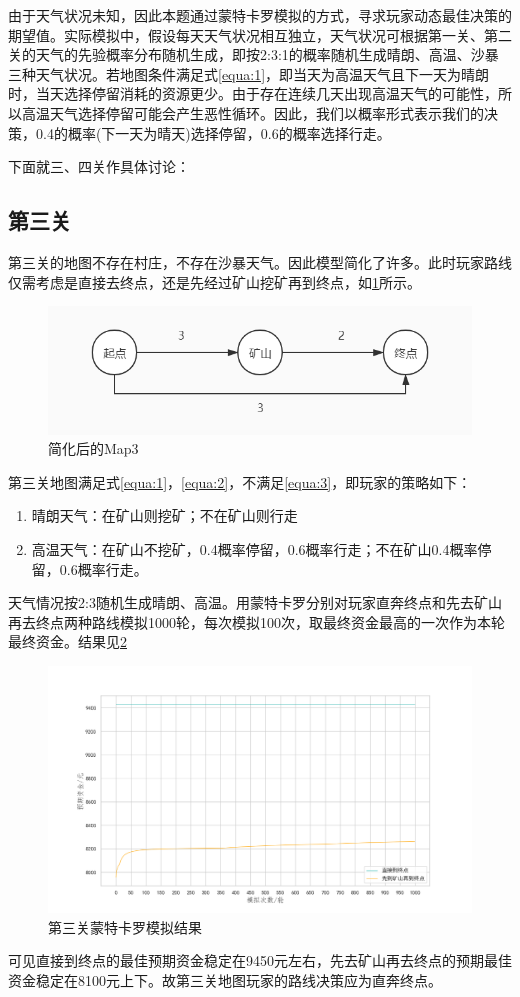 \documentclass[withoutpre]{cumcmthesis} %
\begin{document}
由于天气状况未知，因此本题通过蒙特卡罗模拟的方式，寻求玩家动态最佳决策的期望值。实际模拟中，假设每天天气状况相互独立，天气状况可根据第一关、第二关的天气的先验概率分布随机生成，即按2:3:1的概率随机生成晴朗、高温、沙暴三种天气状况。若地图条件满足式\cref{equa:1}，即当天为高温天气且下一天为晴朗时，当天选择停留消耗的资源更少。由于存在连续几天出现高温天气的可能性，所以高温天气选择停留可能会产生恶性循环。因此，我们以概率形式表示我们的决策，0.4的概率(下一天为晴天)选择停留，0.6的概率选择行走。

下面就三、四关作具体讨论：
\subsection{第三关}
第三关的地图不存在村庄，不存在沙暴天气。因此模型简化了许多。此时玩家路线仅需考虑是直接去终点，还是先经过矿山挖矿再到终点，如\cref{fig:map3}所示。
\begin{figure}[H]
	\centering
	\includegraphics[scale=0.5]{figures/map3.jpg}
	\caption{简化后的Map3}
	\label{fig:map3}
\end{figure}

第三关地图满足式\cref{equa:1}，\cref{equa:2}，不满足\cref{equa:3}，即玩家的策略如下：
\begin{enumerate}
    \item 晴朗天气：在矿山则挖矿；不在矿山则行走
    \item 高温天气：在矿山不挖矿，0.4概率停留，0.6概率行走；不在矿山0.4概率停留，0.6概率行走。
\end{enumerate}

天气情况按2:3随机生成晴朗、高温。用蒙特卡罗分别对玩家直奔终点和先去矿山再去终点两种路线模拟1000轮，每次模拟100次，取最终资金最高的一次作为本轮最终资金。结果见\cref{fig:check3}
\begin{figure}[H]
    \centering
    \includegraphics[scale=0.5]{figures/check3.png}
    \caption{第三关蒙特卡罗模拟结果}
    \label{fig:check3}
\end{figure}
可见直接到终点的最佳预期资金稳定在9450元左右，先去矿山再去终点的预期最佳资金稳定在8100元上下。故第三关地图玩家的路线决策应为直奔终点。
\end{document}
